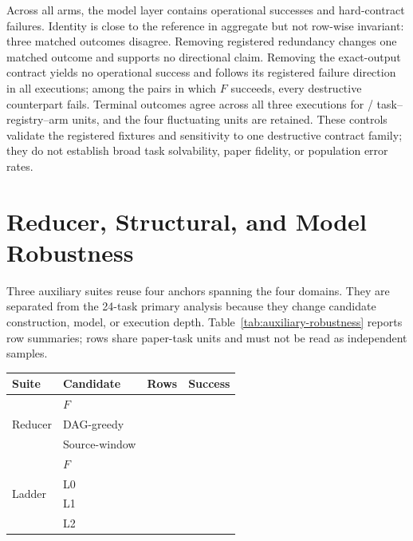 Across all arms, the model layer contains \ControlOperationalSuccess{} operational successes and \ControlContractFailure{} hard-contract failures. Identity is close to the reference in aggregate but not row-wise invariant: three matched outcomes disagree. Removing registered redundancy changes one matched outcome and supports no directional claim. Removing the exact-output contract yields no operational success and follows its registered failure direction in all \ControlRowsPerArm{} executions; among the \ControlFSuccess{} pairs in which $F$ succeeds, every destructive counterpart fails. Terminal outcomes agree across all three executions for \ControlStableUnits{}/\ControlTotalUnits{} task--registry--arm units, and the four fluctuating units are retained. These controls validate the registered fixtures and sensitivity to one destructive contract family; they do not establish broad task solvability, paper fidelity, or population error rates.

\section{Reducer, Structural, and Model Robustness}
\label{app:robustness}

Three auxiliary suites reuse four anchors spanning the four domains. They are separated from the 24-task primary analysis because they change candidate construction, model, or execution depth. Table~\ref{tab:auxiliary-robustness} reports row summaries; rows share paper-task units and must not be read as independent samples.

\begin{center}
\label{tab:auxiliary-robustness}
\footnotesize
\setlength{\tabcolsep}{4pt}
\begin{tabular}{llrr}
\toprule
Suite & Candidate & Rows & Success \\
\midrule
\multirow{3}{*}{Reducer} & $F$ & \ReducerFRows{} & \ReducerFSuccess{} \\
& DAG-greedy & \ReducerCandidateRows{} & \ReducerDAGSuccess{} \\
& Source-window & \ReducerCandidateRows{} & \ReducerSourceSuccess{} \\
\midrule
\multirow{4}{*}{Ladder} & $F$ & \LadderFRows{} & \LadderFSuccess{} \\
& L0 & \LadderCandidateRows{} & \LadderLZeroSuccess{} \\
& L1 & \LadderCandidateRows{} & \LadderLOneSuccess{} \\
& L2 & \LadderCandidateRows{} & \LadderLTwoSuccess{} \\
\bottomrule
\end{tabular}
\end{center}

